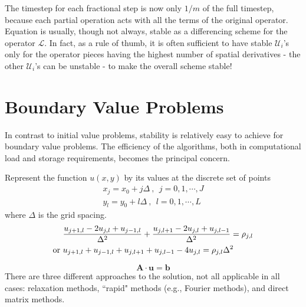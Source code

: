 \documentclass[12pt,a4paper]{article}
\renewcommand{\vec}[1]{\boldsymbol{#1}}
\begin{document}
The timestep for each fractional step is now only $1/m$ of the full timestep, because each partial operation acts with all the terms of the original operator. Equation is usually, though not always, stable as a differencing scheme for the operator $\mathscr L$. In fact, as a rule of thumb, it is often sufficient to have stable $\mathscr U_i$'s only for the operator pieces having the highest number of spatial derivatives - the other $\mathscr U_i$'s can be unstable - to make the overall scheme stable!






\section{Boundary Value Problems}
In contrast to initial value problems, stability is relatively easy to achieve for boundary value problems. The efficiency of the algorithms, both in computational load and storage requirements, becomes the principal concern.

Represent the function $u(x, y)$ by its values at the discrete set of points
\begin{align}
x_j = x_0 +j\Delta ~, ~~ j = 0, 1, \cdots, J \\
y_l = y_0 +l\Delta ~, ~~ l = 0, 1, \cdots, L
\end{align}
where $\Delta$ is the grid spacing. 
\begin{align}
&\frac{u_{j+1, l} -2u_{j, l} +u_{j-1, l} }{\Delta^2} +\frac{u_{j, l+1} -2u_{j, l} +u_{j, l-1} }{\Delta^2} = \rho_{j, l} \\
{\rm or} ~ &u_{j+1, l} +u_{j-1, l} +u_{j, l+1} +u_{j, l-1} -4u_{j, l}  = \rho_{j, l} \Delta^2
\end{align}

\begin{equation}
\vec{A} \cdot \vec{u} = \vec{b}
\end{equation}
There are three different approaches to the solution, not all applicable in all cases: relaxation methods, ``rapid" methods (e.g., Fourier methods), and direct matrix methods.


















































\end{document}
